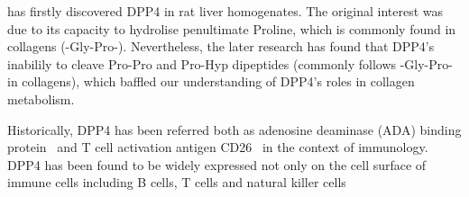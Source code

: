 \citet{Hopsu-Havu1966} has firstly discovered DPP4 in rat liver homogenates. The original interest was due to its capacity to hydrolise penultimate Proline, which is commonly found in collagens (-Gly-Pro-). Nevertheless, the later research has found that DPP4's inabilily to cleave Pro-Pro and Pro-Hyp dipeptides (commonly follows -Gly-Pro- in collagens), which baffled our understanding of DPP4's roles in collagen metabolism.
\par
Historically, DPP4 has been referred both as adenosine deaminase (ADA) binding protein~\cite{Kameoka_1993} and T cell activation antigen CD26~\cite{Fleischer_1994} in the context of immunology. DPP4 has been found to be widely expressed not only on the cell surface of immune cells including B cells, T cells and natural killer cells~\cite{Fleischer1987,Fleischer1988,Gorrell1991,Capuani2018,Bühling1994,Bühling1995}